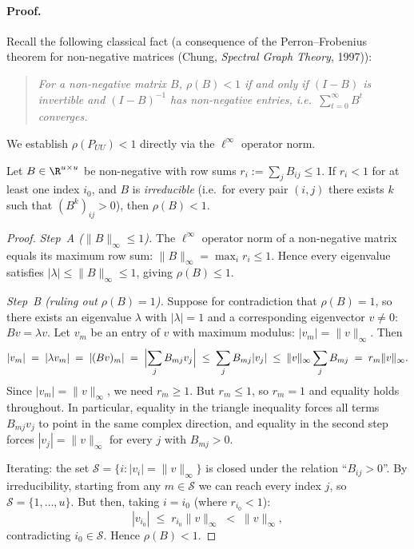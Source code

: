 \begin{notechapter}
\paragraph{Proof.}
Recall the following classical fact (a consequence of the Perron--Frobenius
theorem for non-negative matrices (Chung, \emph{Spectral Graph Theory}, 1997)):

\begin{quote}
\emph{For a non-negative matrix $B$, $\rho(B) < 1$ if and only if
$(I - B)$ is invertible and $(I-B)^{-1}$ has non-negative entries, i.e.\
$\sum_{t=0}^\infty B^t$ converges.}
\end{quote}

We establish $\rho(P_{UU}) < 1$ directly via the $\ell^\infty$ operator norm.

\begin{lemma}
Let $B \in \R^{u \times u}$ be non-negative with row sums
$r_i := \sum_j B_{ij} \leq 1$.  If $r_i < 1$ for at least one index $i_0$,
and $B$ is \emph{irreducible} (i.e.\ for every pair $(i,j)$ there exists $k$
such that $(B^k)_{ij} > 0$), then $\rho(B) < 1$.
\end{lemma}

\begin{proof}
\emph{Step~A ($\|B\|_\infty \leq 1$).}
The $\ell^\infty$ operator norm of a non-negative matrix equals its maximum row
sum: $\|B\|_\infty = \max_i r_i \leq 1$.  Hence every eigenvalue satisfies
$|\lambda| \leq \|B\|_\infty \leq 1$, giving $\rho(B) \leq 1$.

\emph{Step~B (ruling out $\rho(B) = 1$).}
Suppose for contradiction that $\rho(B)=1$, so there exists an eigenvalue
$\lambda$ with $|\lambda|=1$ and a corresponding eigenvector $v \neq 0$:
$Bv = \lambda v$.  Let $v_m$ be an entry of $v$ with maximum modulus:
$|v_m| = \|v\|_\infty$.  Then
\[
  |v_m| \;=\; |\lambda v_m| \;=\; |(Bv)_m|
  \;=\; \Bigl|\sum_j B_{mj} v_j\Bigr|
  \;\leq\; \sum_j B_{mj}|v_j|
  \;\leq\; \|v\|_\infty \sum_j B_{mj}
  \;=\; r_m \|v\|_\infty.
\]
Since $|v_m| = \|v\|_\infty$, we need $r_m \geq 1$.  But $r_m \leq 1$, so
$r_m = 1$ and equality holds throughout.  In particular, equality in the
triangle inequality forces all terms $B_{mj}v_j$ to point in the same complex
direction, and equality in the second step forces $|v_j| = \|v\|_\infty$
for every $j$ with $B_{mj} > 0$.

Iterating: the set $\mathcal{S} = \{i : |v_i| = \|v\|_\infty\}$ is closed
under the relation ``$B_{ij} > 0$''.  By irreducibility, starting from any
$m \in \mathcal{S}$ we can reach every index $j$, so $\mathcal{S} = \{1,
\ldots, u\}$.  But then, taking $i = i_0$ (where $r_{i_0} < 1$):
\[
  |v_{i_0}| \;\leq\; r_{i_0}\|v\|_\infty \;<\; \|v\|_\infty,
\]
contradicting $i_0 \in \mathcal{S}$.  Hence $\rho(B) < 1$.
\end{proof}


\end{notechapter}
